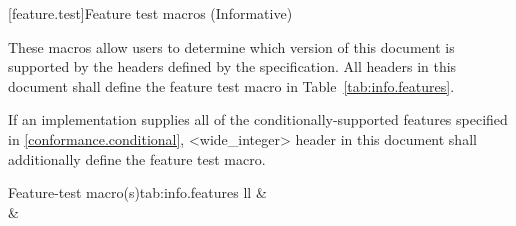 
[feature.test]{Feature test macros (Informative)}

\pnum
These macros allow users to determine which version of this document is supported by the headers defined by the specification. All headers in this document shall define the  feature test macro in Table~\ref{tab:info.features}.

\pnum
If an implementation supplies all of the conditionally-supported features specified in \ref{conformance.conditional}, <wide_integer> header in this document shall additionally define the  feature test macro.

\begin{floattable}{Feature-test macro(s)}{tab:info.features}
{ll}
\topline
{} &  \\
\capsep
{}  & \tcode{\tsver}      \\
\end{floattable}

